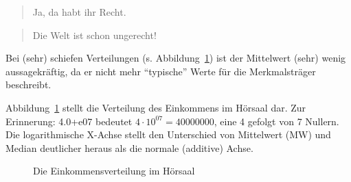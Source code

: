 \documentclass[
  letterpaper,
]{scrbook}
\theoremstyle{definition}
\theoremstyle{definition}
\theoremstyle{definition}
\theoremstyle{remark}
\begin{document}
\begin{quote}
{} Ja, da habt ihr Recht.
\end{quote}

\begin{quote}
{} Die Welt ist schon ungerecht!
\end{quote}

\begin{tcolorbox}[enhanced jigsaw, colbacktitle=quarto-callout-important-color!10!white, toptitle=1mm, colframe=quarto-callout-important-color-frame, breakable, toprule=.15mm, bottomrule=.15mm, bottomtitle=1mm, left=2mm, opacitybacktitle=0.6, colback=white, arc=.35mm, coltitle=black, title=\textcolor{quarto-callout-important-color}{\faExclamation}\hspace{0.5em}{Wichtig}, opacityback=0, rightrule=.15mm, leftrule=.75mm, titlerule=0mm]

Bei (sehr) schiefen Verteilungen (s. Abbildung~\ref{fig-mbappe}) ist der
Mittelwert (sehr) wenig aussagekräftig, da er nicht mehr
\enquote{typische} Werte für die Merkmalsträger beschreibt.

\end{tcolorbox}

Abbildung~\ref{fig-mbappe} stellt die Verteilung des Einkommens im
Hörsaal dar. Zur Erinnerung: 4.0+e07 bedeutet
\(4 \cdot 10^{07} = 40000000\), eine 4 gefolgt von 7 Nullern. Die
logarithmische X-Achse stellt den Unterschied von Mittelwert (MW) und
Median deutlicher heraus als die normale (additive) Achse.

\begin{figure}

\begin{minipage}{\linewidth}



\end{minipage}%

\caption{\label{fig-mbappe}Die Einkommensverteilung im Hörsaal}

\end{figure}%
\end{document}
